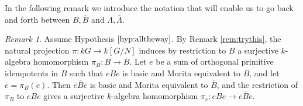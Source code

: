 \documentclass{amsart}
\theoremstyle{plain}
\theoremstyle{definition}
\theoremstyle{remark}
\newtheorem{rem}[thm]{Remark}
\begin{document}
In the following remark we introduce the notation that will enable us to go back and forth between
$B,\overline{B}$ and $\Lambda,\overline{\Lambda}$.

\begin{rem}
\label{rem:oyvey}
Assume Hypothesis $\ref{hyp:alltheway}$. By Remark \ref{rem:trythis}, the natural
projection $\pi:kG\to k[G/N]$ induces by restriction to $B$
a surjective $k$-algebra homomorphism $\pi_B: B\to \overline{B}$. Let $e$ be a
sum of orthogonal primitive idempotents in $B$ such that $eBe$ is basic and Morita equivalent to $B$, 
and let $\overline{e}=\pi_B(e)$. Then $\overline{e}\overline{B}\overline{e}$ is basic and Morita
equivalent to $\overline{B}$, and 
the restriction of $\pi_B$ to $eBe$ gives a surjective $k$-algebra homomorphism $\pi_e:eBe\to 
\overline{e}\overline{B}\overline{e}$. 


\end{rem}
\end{document}
